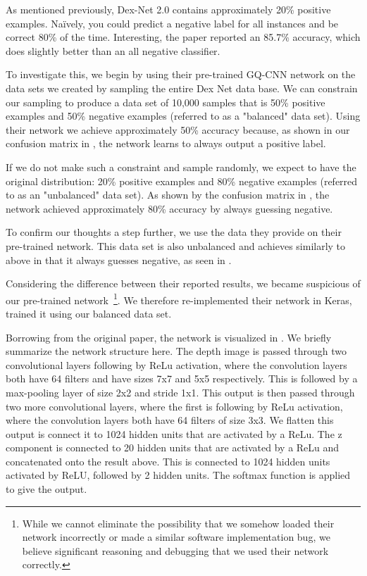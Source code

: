 As mentioned previously, Dex-Net 2.0 contains approximately 20\% positive examples. 
Na{\"i}vely, you could predict a negative label for all instances and be correct 80\% of the time. Interesting, the paper reported an 85.7\% accuracy, which does slightly better than an all negative classifier. 

To investigate this, we begin by using their pre-trained GQ-CNN network  on the data sets we created by sampling the entire Dex Net data base. 
We can constrain our sampling to produce a data set of 10,000 samples that is 50\% positive examples and 50\% negative examples (referred to as a "balanced" data set). 
Using their network we achieve approximately 50\% accuracy because, as shown in our confusion matrix in , the network learns to always output a positive label. 

If we do not make such a constraint and sample randomly, we expect to have the original distribution: 20\% positive examples and 80\% negative examples (referred to as an "unbalanced" data set). 
As shown by the confusion matrix in , the network achieved approximately 80\% accuracy by always guessing negative. 

To confirm our thoughts a step further, we use the data they provide on their pre-trained network. 
This data set is also unbalanced and achieves similarly to above in that it always guesses negative, as seen in . 

Considering the difference between their reported results, we became suspicious of our pre-trained network~\footnote{While we cannot eliminate the possibility that we somehow loaded their network incorrectly or made a similar software implementation bug, we believe significant reasoning and debugging that we used their network correctly.}.
We therefore re-implemented their network in Keras, trained it using our balanced data set. 

Borrowing from the original paper, the network is visualized in . 
We briefly summarize the network structure here. 
The depth image is passed through two convolutional layers following by ReLu activation, where the convolution layers both have 64 filters and have sizes 7x7 and 5x5 respectively. 
This is followed by a max-pooling layer of size 2x2 and stride 1x1. 
This output is then passed through two more convolutional layers, where the first is following by ReLu activation, where the convolution layers both have 64 filters of size 3x3. 
We flatten this output is connect it to 1024 hidden units that are activated by a ReLu. 
The z component is connected to 20 hidden units that are activated by a ReLu and concatenated onto the result above. 
This is connected to 1024 hidden units activated by ReLU, followed by 2 hidden units. 
The softmax function is applied to give the output. 

